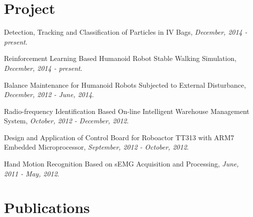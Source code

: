 \documentclass[letterpaper]{article}
\renewenvironment{itemize}{
  \begin{list}{}{
    \setlength{\leftmargin}{1.5em}
  }
}{
  \end{list}
}
\begin{document}
\section*{Project}

\begin{itemize}
	\item Detection, Tracking and Classification of Particles in IV Bags,
	{\it December, 2014 - present}.
	\item Reinforcement Learning Based Humanoid Robot Stable Walking Simulation,
	{\it December, 2014 - present}. 
	\item Balance Maintenance for Humanoid Robots Subjected to External Disturbance, 
    {\it December, 2012 - June, 2014}.
    \item Radio-frequency Identification Based On-line Intelligent Warehouse Management System,
    {\it October, 2012 - December, 2012}.
    \item Design and Application of Control Board for Roboactor TT313 with ARM7 Embedded Microprocessor,
    {\it September, 2012 - October, 2012}.
    \item Hand Motion Recognition Based on sEMG Acquisition and Processing,
    {\it June, 2011 - May, 2012}.
\end{itemize}

\section*{Publications}

%
\end{document}

